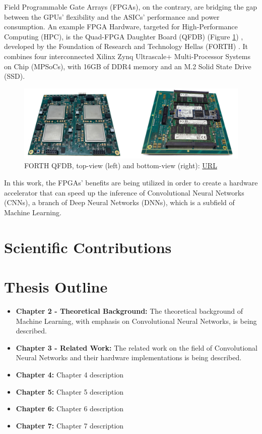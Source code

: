 Field Programmable Gate Arrays (FPGAs), on the contrary, are bridging the gap between the GPUs' flexibility and the ASICs' performance and power consumption. An example FPGA Hardware, targeted for High-Performance Computing (HPC), is the Quad-FPGA Daughter Board (QFDB) (Figure \ref{fig:forth-qfdb-daughterboard}) \cite{Implementation-and-Impact-of-an-Ultra-Compact-Multi-FPGA-Board-for-Large-System-Prototyping}, developed by the Foundation of Research and Technology Hellas (FORTH) \cite{FORTH}. It combines four interconnected Xilinx Zynq Ultrascale+ Multi-Processor Systems on Chip (MPSoCs), with 16GB of DDR4 memory and an M.2 Solid State Drive (SSD).

\begin{figure} [H]
	\centering
	\includegraphics[scale=0.22]{Images/Hardware/QFDB.png}
	\decoRule
	\caption[FORTH QFDB]{FORTH QFDB, top-view (left) and bottom-view (right): \href{https://ieeexplore.ieee.org/stamp/stamp.jsp?arnumber=8945720}{URL}}
	\label{fig:forth-qfdb-daughterboard}
\end{figure}

In this work, the FPGAs' benefits are being utilized in order to create a hardware accelerator that can speed up the inference of Convolutional Neural Networks (CNNs), a branch of Deep Neural Networks (DNNs), which is a subfield of Machine Learning.

\section{Scientific Contributions}

\section{Thesis Outline}
\begin{itemize}
	\item \textbf{Chapter 2 - Theoretical Background:} The theoretical background of Machine Learning, with emphasis on Convolutional Neural Networks, is being described.
	\item \textbf{Chapter 3 - Related Work:} The related work on the field of Convolutional Neural Networks and their hardware implementations is being described.
	\item \textbf{Chapter 4:} Chapter 4 description
	\item \textbf{Chapter 5:} Chapter 5 description
	\item \textbf{Chapter 6:} Chapter 6 description
	\item \textbf{Chapter 7:} Chapter 7 description
\end{itemize}
